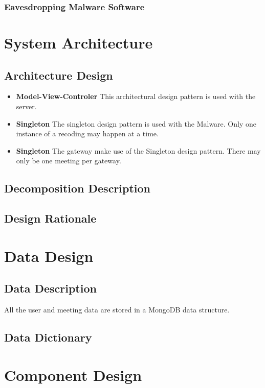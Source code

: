 \documentclass[a4paper,12pt,titlepage]{article}
\begin{document}
\subsubsection{Eavesdropping Malware Software}


\newpage\section{System Architecture}
	\subsection{Architecture Design}
		\begin{itemize}
			\item\textbf{ Model-View-Controler} This architectural design pattern is used with the server. %
			\item\textbf{ Singleton} The singleton design pattern is used with the Malware. Only one instance of a recoding may happen at a time. %
			\item\textbf{ Singleton} The gateway make use of the Singleton design pattern. There may only be one meeting per gateway. %
		\end{itemize}
	\subsection{Decomposition Description}
	\subsection{Design Rationale}

\newpage\section{Data Design}
	\subsection{Data Description} All the user and meeting data are stored in a MongoDB data structure. %
	\subsection{Data Dictionary}

\newpage\section{Component Design}
\end{document}
